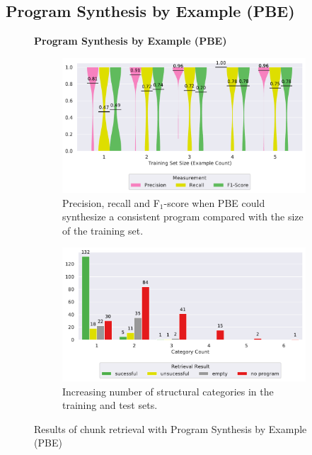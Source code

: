 \subsection{Program Synthesis by Example (PBE)}
\label{sec:r:pbe}
\begin{figure}
\centering
    \textbf{Program Synthesis by Example (PBE)}\par\medskip
\begin{subfigure}[b]{\columnwidth}
		\centering
		\includegraphics[width=\columnwidth,
		clip]{img/big-study/recall-precision-examplecount-sythesisworked-PBE.pdf}
				\caption{Precision, recall and
				F$_{1}$-score when PBE could synthesize
				a consistent program compared with the
				size of the training set.}
		\label{fig:recall-precision-examplecount-sythesisworked-PBE}
\end{subfigure}\hspace{\fill}
\begin{subfigure}[b]{\columnwidth}
		\centering
		\includegraphics[width=\columnwidth,
		clip]{img/big-study/failure-reason-categorycount-PBE.pdf}
				\caption{Increasing number of structural
				categories in the training and test sets.}
		\label{fig:failure-reason-categorycount-PBE}
\end{subfigure}
\caption{Results of chunk retrieval with  Program Synthesis by Example
(PBE)}
\end{figure}


